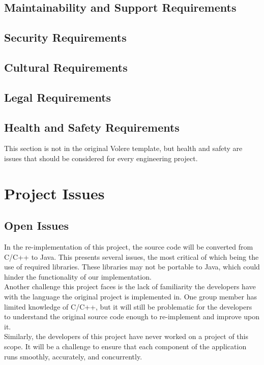 \documentclass[12pt, titlepage]{article}
\begin{document}
\subsection{Maintainability and Support Requirements}

\subsection{Security Requirements}

\subsection{Cultural Requirements}

\subsection{Legal Requirements}

\subsection{Health and Safety Requirements}

This section is not in the original Volere template, but health and safety are
issues that should be considered for every engineering project.

\section{Project Issues}
\subsection{Open Issues}
\indent \indent In the re-implementation of this project, the source code will be converted from C/C++ to Java. This presents several issues, the most critical of which being the use of required libraries. These libraries may not be portable to Java, which could hinder the functionality of our implementation. 
\\
\indent Another challenge this project faces is the lack of familiarity the developers have with the language the original project is implemented in. One group member has limited knowledge of C/C++, but it will still be problematic for the developers to understand the original source code enough to re-implement and improve upon it.
\\
\indent Similarly, the developers of this project have never worked on a project of this scope. It will be a challenge to ensure that each component of the application runs smoothly, accurately, and concurrently.
\end{document}

